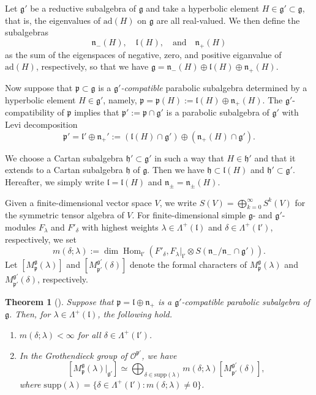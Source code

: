 \documentclass[reqno,11pt]{amsart}
\newtheorem{thm}[equation]{Theorem}
\theoremstyle{remark}
\theoremstyle{definition}
\numberwithin{equation}{section}
\newcommand{\gL}{\Lambda}
\newcommand{\fg}{{\mathfrak g}}
\newcommand{\fh}{{\mathfrak h}}
\newcommand{\fl}{{\mathfrak l}}
\newcommand{\fn}{{\mathfrak n}}
\newcommand{\fp}{{\mathfrak p}}
\newcommand{\ad}{\mathrm{ad}}
\newcommand{\Cal}{\mathcal}
\newcommand{\Hom}{\operatorname{Hom}}
\newcommand{\Mp}{M^{\fg}_{\fp}}
\newcommand{\Mpp}{M^{\fg'}_{\fp'}}
\begin{document}
\vskip 0.1in
Let $\fg'$ be a reductive subalgebra of $\fg$ and
take a hyperbolic element $H\in \fg' \subset \fg$, that is,
the eigenvalues of $\ad(H)$ on $\fg$
are all real-valued. We then define the subalgebras
\begin{equation*}
\fn_-(H),
\quad
 \fl(H),
\quad
\text{and}
\quad
\fn_+(H)
\end{equation*}
as the sum of the eigenspaces of negative, zero, and positive 
eiganvalue of $\ad(H)$, respectively, so that we have 
$\fg=\fn_-(H) \oplus \fl(H) \oplus \fn_+(H)$.

Now suppose that $\fp \subset \fg$ is 
a \emph{$\fg'$-compatible} parabolic subalgebra 
determined by a hyperbolic element $H \in \fg'$,
namely, $\fp = \fp(H):=\fl(H)\oplus \fn_+(H)$.
The $\fg'$-compatibility of $\fp$ implies that
$\fp':=\fp \cap \fg'$ is a parabolic subalgebra of $\fg'$
with Levi decomposition
\begin{equation*}
\fp'=\fl' \oplus \fn_+' :=(\fl(H)\cap \fg') \oplus (\fn_+(H)\cap \fg').
\end{equation*}

We choose a Cartan subalgebra
$\fh' \subset \fg'$ in such a way that  $H \in \fh'$ and that
it extends to a Cartan subalgebra $\fh$ of $\fg$. Then we have 
$\fh \subset \fl(H)$
and $\fh' \subset \fg'$. Hereafter, we simply write 
$\fl =\fl(H)$ and $\fn_{\pm}=\fn_{\pm}(H)$.

Given a finite-dimensional vector space $V$, we write 
$S(V)=\bigoplus_{k=0}^\infty S^k(V)$ for the symmetric tensor algebra 
of $V$. 
For finite-dimensional simple $\fg$- and $\fg'$-modules
$F_\lambda$ and $F'_\delta$ with highest weights $\lambda \in \gL^+(\fl)$
and $\delta \in \gL^+(\fl')$, respectively, we set
\begin{equation*}
m(\delta;\lambda):=
\dim
\Hom_{\fl'}(F'_\delta, F_\lambda\vert_{\fl'} \otimes S(\fn_-/\fn_-\cap \fg')).
\end{equation*}
Let $[\Mp(\lambda)]$ and $[\Mpp(\delta)]$ denote the formal characters 
of $\Mp(\lambda)$ and $\Mpp(\delta)$, respectively.

\begin{thm}[{\cite[Thm.\ 3.10]{Kobayashi12}}]\label{thm:bGVM}
Suppose that $\fp=\fl \oplus \fn_+$ is a $\fg'$-compatible parabolic subalgebra
of $\fg$. Then, for $\lambda \in \gL^+(\fl)$,  the following hold.

\begin{enumerate}
\item[\emph{(1)}]
$m(\delta;\lambda) < \infty$ for all $\delta \in \gL^+(\fl')$.

\item[\emph{(2)}]
In the Grothendieck group of $\Cal{O}^{\fp'}$, we have
\begin{equation}\label{eqn:bGVM}
[\Mp(\lambda)\vert_{\fg'}]
\simeq 
\bigoplus_{\delta \in \mathrm{supp}(\lambda)}
m(\delta; \lambda) [\Mpp(\delta)],
\end{equation}
where $\mathrm{supp}(\lambda) = \{\delta \in \gL^+(\fl'):m(\delta;\lambda)\neq 0\}$.
\end{enumerate}
\end{thm}
\end{document}
